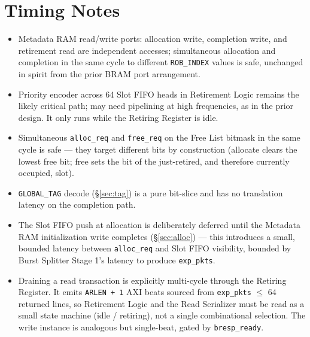 \section{Timing Notes}

\begin{itemize}[noitemsep]
  \item Metadata RAM read/write ports: allocation write, completion write, and retirement read are independent accesses; simultaneous allocation and completion in the same cycle to different \texttt{ROB\_INDEX} values is safe, unchanged in spirit from the prior BRAM port arrangement.
  \item Priority encoder across 64 Slot FIFO heads in Retirement Logic remains the likely critical path; may need pipelining at high frequencies, as in the prior design. It only runs while the Retiring Register is idle.
  \item Simultaneous \texttt{alloc\_req} and \texttt{free\_req} on the Free List bitmask in the same cycle is safe --- they target different bits by construction (allocate clears the lowest free bit; free sets the bit of the just-retired, and therefore currently occupied, slot).
  \item \texttt{GLOBAL\_TAG} decode (\S\ref{sec:tag}) is a pure bit-slice and has no translation latency on the completion path.
  \item The Slot FIFO push at allocation is deliberately deferred until the Metadata RAM initialization write completes (\S\ref{sec:alloc}) --- this introduces a small, bounded latency between \texttt{alloc\_req} and Slot FIFO visibility, bounded by Burst Splitter Stage 1's latency to produce \texttt{exp\_pkts}.
  \item Draining a read transaction is explicitly multi-cycle through the Retiring Register.  It emits \texttt{ARLEN + 1} AXI beats sourced from \texttt{exp\_pkts} $\le$ 64 returned lines, so Retirement Logic and the Read Serializer must be read as a small state machine (idle / retiring), not a single combinational selection. The write instance is analogous but single-beat, gated by \texttt{bresp\_ready}.
\end{itemize}
